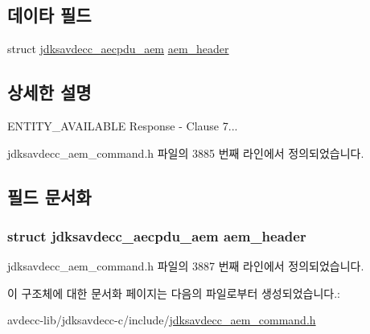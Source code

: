 \subsection*{데이타 필드}
\begin{DoxyCompactItemize}
\item 
struct \hyperlink{structjdksavdecc__aecpdu__aem}{jdksavdecc\+\_\+aecpdu\+\_\+aem} \hyperlink{structjdksavdecc__aem__command__entity__available__response_ae1e77ccb75ff5021ad923221eab38294}{aem\+\_\+header}
\end{DoxyCompactItemize}


\subsection{상세한 설명}
E\+N\+T\+I\+T\+Y\+\_\+\+A\+V\+A\+I\+L\+A\+B\+LE Response -\/ Clause 7... 

jdksavdecc\+\_\+aem\+\_\+command.\+h 파일의 3885 번째 라인에서 정의되었습니다.



\subsection{필드 문서화}
\subsubsection[{\texorpdfstring{aem\+\_\+header}{aem_header}}]{\setlength{\rightskip}{0pt plus 5cm}struct {\bf jdksavdecc\+\_\+aecpdu\+\_\+aem} aem\+\_\+header}\hypertarget{structjdksavdecc__aem__command__entity__available__response_ae1e77ccb75ff5021ad923221eab38294}{}\label{structjdksavdecc__aem__command__entity__available__response_ae1e77ccb75ff5021ad923221eab38294}


jdksavdecc\+\_\+aem\+\_\+command.\+h 파일의 3887 번째 라인에서 정의되었습니다.



이 구조체에 대한 문서화 페이지는 다음의 파일로부터 생성되었습니다.\+:\begin{DoxyCompactItemize}
\item 
avdecc-\/lib/jdksavdecc-\/c/include/\hyperlink{jdksavdecc__aem__command_8h}{jdksavdecc\+\_\+aem\+\_\+command.\+h}\end{DoxyCompactItemize}
